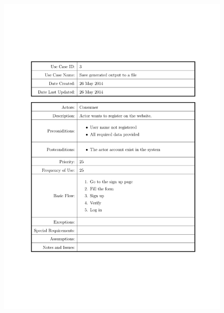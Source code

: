 \documentclass[a4paper]{tufte-book}
\begin{document}
\begin{figure}[h] \includegraphics[width=\linewidth]{Requirements/UseCases/003_SignUp.pdf}\end{figure}
\end{document}
